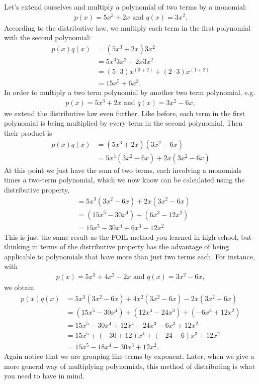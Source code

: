 Let's extend ourselves and multiply a polynomial of two terms by a monomial:
\begin{align*} 
p(x)  = 5x^3 + 2x \text{ and }
q(x)  = 3x^2.
\end{align*}
According to the distributive law, we multiply each term in the first polynomial with the second polynomial:
\begin{align*}
p(x)  q(x) 
& = ( 5x^3 +2x)  3x^2 \\
&= 5x^3 3x^2 + 2x 3x^2\\
& = (5 \cdot 3)x^{(3 + 2)} + (2 \cdot 3)x^{(1+2)}\\ 
& = 15x^5 + 6x^3.
\end{align*}
In order to  multiply a two term polynomial by another two term polynomial, e.g.
\begin{align*} 
p(x)  = 5x^3 + 2x \text{ and } q(x)  = 3x^2 - 6x,
\end{align*}
we extend the distributive law even further.  Like before, each term in the first polynomial is being multiplied by every term in the second polynomial,
Then their product is
\begin{align*}
p(x)  q(x) 
& = ( 5x^3 +2x)  (3x^2 - 6x) \\
& = 5x^3 (3x^2 - 6x) +2x(3x^2 - 6x) 
\end{align*}
At this point we just have the sum of two terms, each involving a monomials times a two-term polynomial, which we now know can be calculated using the distributive property,
\begin{align*}
& = 5x^3 (3x^2 - 6x) +2x(3x^2 - 6x) \\
& = (15x^5 -30x^4) + (6x^3-12x^2)\\
&= 15x^5 - 30x^4 + 6x^3 - 12x^2
\end{align*}
This is just the same result as the FOIL method you learned in high school, but thinking in terms of the distributive property has the advantage of being applicable to polynomials that have more than just two terms each.  
For instance, with
\begin{align*}
p(x)  = 5x^3 + 4x^2 - 2x \text{ and } q(x)  = 3x^2 - 6x,
\end{align*}
we obtain
\begin{align*}
p(x) q(x)
& = 5x^3 (3x^2 - 6x) +4x^2(3x^2 - 6x)-2x(3x^2 - 6x) \\
& = (15x^5 -30x^4) + (12x^4 - 24x^3)  + (-6x^3 + 12x^2)\\
&= 15x^5 - 30x^4 + 12x^4-24x^3 - 6x^3 + 12x^2\\
&= 15x^5 + (-30+12)x^4 + (-24-6)x^3 +12x^2 \\
&= 15x^5 - 18x^4 - 30x^3 +12x^2.
\end{align*}
Again notice that we are grouping like terms by exponent.  Later, when we give a more general way of multiplying polynomials, this method of distributing is what you need to have in mind.

